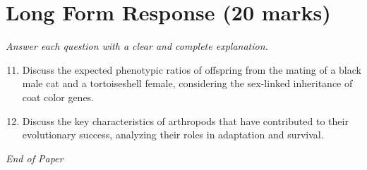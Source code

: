 \documentclass[12pt]{article}
\begin{document}
\section*{Long Form Response (20 marks)}
\textit{Answer each question with a clear and complete explanation.}
\begin{enumerate}[label=\arabic*.]
\setcounter{enumi}{10}
\item Discuss the expected phenotypic ratios of offspring from the mating of a black male cat and a tortoiseshell female, considering the sex-linked inheritance of coat color genes.
\item Discuss the key characteristics of arthropods that have contributed to their evolutionary success, analyzing their roles in adaptation and survival.
\end{enumerate}

\vfill
\noindent\textit{End of Paper}
\end{document}
